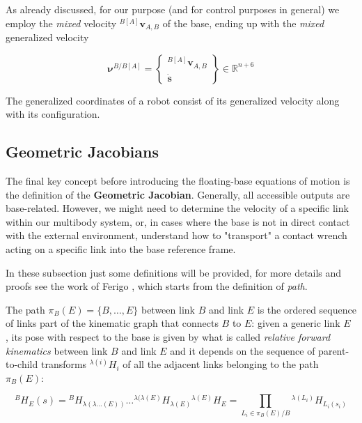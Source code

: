     As already discussed, for our purpose (and for control purposes in general) we employ the \textit{mixed} velocity ${}^{B[A]} \mathbf{v}_{A,B}$ of the base, ending up with the \textit{mixed} generalized velocity

    \begin{equation}
       \bm{\nu}^{B/B[A]} = \begin{Bmatrix}
           {}^{B[A]} \mathbf{v}_{A,B}\\
           \dot{\mathbf{s}}
       \end{Bmatrix} \in \mathbb{R}^{n+6}
    \label{eq: mixed generalized multibody velocity} 
    \end{equation}
    
    The generalized coordinates of a robot consist of its generalized velocity along with its configuration.
    
    \subsection{Geometric Jacobians}
    \label{subsec: Geometric Jacobians}

    The final key concept before introducing the floating-base equations of motion is the definition of the \textbf{Geometric Jacobian}. 
    Generally, all accessible outputs are base-related. However, we might need to determine the velocity of a specific link within our multibody system, or, in cases where the base is not in direct contact with the external environment, understand how to "transport" a contact wrench acting on a specific link into the base reference frame.

    In these subsection just some definitions will be provided, for more details and proofs see the work of Ferigo \cite{ferigo_phd_thesis_2022}, which starts from the definition of \textit{path}.

    The path $\pi_B(E) = \{B, \ldots, E\}$ between link $B$ and link $E$ is the ordered sequence of links part of the kinematic graph that connects $B$ to $E$: given a generic link $E$ , its pose with respect to the base is given by what is called \textit{relative forward kinematics} between link $B$ and link $E$ and it depends on the sequence of parent-to-child transforms ${}^{\lambda(i)} {H}_i$ of all the adjacent links belonging to the path $\pi_B(E)$:

    \begin{equation}
        {}^{B}  {H}_{E}( {s}) = {}^{B} {H}_{\lambda(\lambda \ldots (E))} \ldots {}^{\lambda(\lambda(E)} {H}_{\lambda(E)} {}^{\lambda(E)} {H}_{E} = \prod_{L_i \in \pi_B(E)/B} {}^{\lambda(L_i)} {H}_{L_i(s_i)}
    \label{eq: path definition}
    \end{equation}

